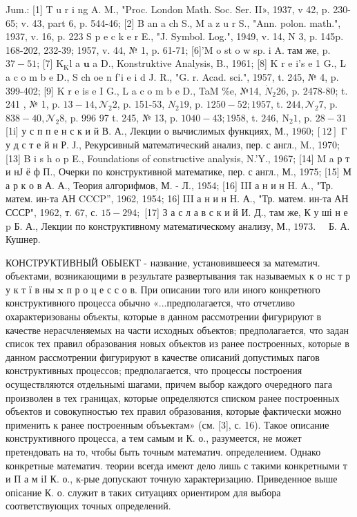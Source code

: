 \documentclass[10pt]{article}
\begin{document}
Jum.: [1] T u r i ng A. M., "Proc. London Math. Soc. Ser. II», 1937, v 42, p. 230-65; v. 43, part 6, p. 544-46; [2] B an a ch S., M a z u r S., "Ann. polon. math.", 1937, v. 16, p. 223 S p e c k e r E., "J. Symbol. Log.", 1949, v. 14, N 3, p. 145p. 168-202, 232-39; 1957, v. 44, № 1, p. 61-71; [6]'M o st o w sp. i A. там же, p. $37-51$; [7] $\mathrm{K}_{\mathrm{K}} \mathrm{l}$ a $\mathbf{u}$ a D., Konstruktive Analysis, B., 1961; [8] K r e i's e 1 G., L a c o m b e D., S ch oe n f'i e i d J. R., "G. r. Acad. sci.", 1957, t. 245, № 4, p. 399-402; [9] K r e is e I G., L a c o m b e D., TaM \%e, №14, $\dot{N}_{2} 26$, p. 2478-80; t. 241 , № 1, p. $13-14, \mathcal{N}_{2} 2$, p. 151-53, $N_{2} 19$, p. $1250-52 ; 1957$, t. $244, \mathcal{N}_{2} 7$, p. $838-40, \mathcal{N}_{2} 8$, p. 996 97 t. 245, № 13, p. $1040-43 ; 1958$, t. $246, \mathrm{~N}_{2} 1$, p. $28-31$ [1i] у с п п е н с к и й В. А., Лекции о вычислимых функциях, М., $1960 ;[12]$ Г у д с т е й н Р. Ј., Рекурсивный математический анализ, пер. с англ., M., 1970; [13] B i s h o p E., Foundations of constructive analysis, N.'Y., 1967; [14] M a р т и нЈ ё ф П., Очерки по конструктивной математике, пер. с англ., М., 1975; [15] М а р к о в А. А., Теория алгорифмов, М. - Л., 1954; [16] III а н и н H. A., "Тр. матем. ин-та АН CCCP”, 1962, 1954; 16$]$ III а н и н H. А., "Тр. матем. ин-та АН СССР", 1962, т. 67, с. $15-294 ;$ [17] З а с л а в с к и й И. Д., там же, К у ші н е p Б. А., Лекции по конструктивному математическому анализу, М., $1973 . \quad$ Б. А. Кушнер.



КОНСТРУКТИВНЫЙ ОБЫЕКТ - название, установившееся за математич. объектами, возникающими в результате развертывания так называемых к о нс т р у к т ї в ны $\mathbf{x}$ п р о ц е с с о в. При описании того или иного конкретного конструктивного процесса обычно «...предполагается, что отчетливо охарактеризованы объекты, которые в данном рассмотрении фигурируют в качестве нерасчленяемых на части исходных объектов; предполагается, что задан список тех правил образования новых объектов из ранее построенных, которые в данном рассмотрении фигурируют в качестве описаний допустимых пагов конструктивных процессов; предполагается, что процессы построения осуществляются отдельнымі шагами, причем выбор каждого очередного пага произволен в тех границах, которые определяются списком ранее построенных объектов и совокупностью тех правил образования, которые фактически можно применить к ранее построенным объъектам» (см. [3], с. 16). Такое описание конструктивного процесса, а тем самым и К. о., разумеется, не может претендовать на то, чтобы быть точным математич. определением. Однако конкретные математич. теории всегда имеют дело лишь с такими конкретными т и П а м іІ К. о., к-рые допускают точную характеризацию. Приведенное выше опісание К. о. служит в таких ситуациях ориентиром для выбора соответствующих точных определений.
\end{document}
